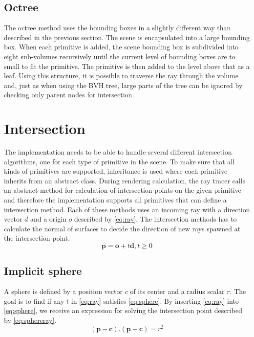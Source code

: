 \documentclass[a4paper, 12pt]{report}
\begin{document}
\subsection{Octree}
The octree method uses the bounding boxes in a slightly different way than described in the previous section.
The scene is encapsulated into a large bounding box.
When each primitive is added, the scene bounding box is subdivided into eight sub-volumes recursively until the current level of bounding boxes are to small to fit the primitive.
The primitive is then added to the level above that as a leaf.
Using this structure, it is possible to traverse the ray through the volume and, just as when using the BVH tree, large parts of the tree can be ignored by checking only parent nodes for intersection.

\section{Intersection}
The implementation needs to be able to handle several different intersection algorithms, one for each type of primitive in the scene.
To make sure that all kinds of primitives are supported, inheritance is used where each primitive inherits from an abstract class.
During rendering calculation, the ray tracer calls an abstract method for calculation of intersection points on the given primitive and therefore the implementation supports all primitives that can define a intersection method.
Each of these methods uses an incoming ray with a direction vector $d$ and a origin $o$ described by \autoref{eq:ray}.
The intersection methods has to calculate the normal of surfaces to decide the direction of new rays spawned at the intersection point.
\begin{equation} \label{eq:ray}
\mathbf{p} = \mathbf{o} + t \mathbf{d}, t \geq 0
\end{equation}

\subsection{Implicit sphere}
A sphere is defined by a position vector $c$ of its center and a radius scalar $r$. 
The goal is to find if any $t$ in \autoref{eq:ray} satisfies \autoref{eq:sphere}. 
By inserting \autoref{eq:ray} into \autoref{eq:sphere}, we receive an expression for solving the intersection point described by \autoref{eq:sphereray}.
\begin{equation} \label{eq:sphere}
(\mathbf{p} - \mathbf{c}).(\mathbf{p} - \mathbf{c}) = r^2
\end{equation}
\end{document}
